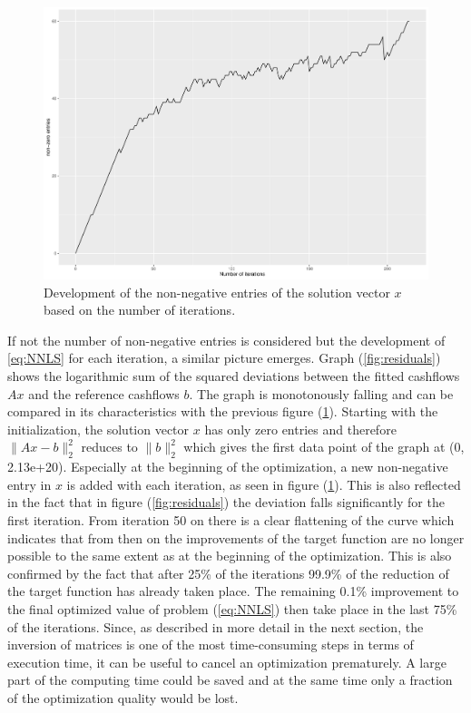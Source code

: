 \begin{figure}
	\centering
	\includegraphics[width=\textwidth]{figures/chapter_NNLS/number_iterations}
	\caption{Development of the non-negative entries of the solution vector $x$ based on the number of iterations.}
	\label{fig:iterations}
\end{figure}

If not the number of non-negative entries is considered but the development of \ref{eq:NNLS} for each iteration, a similar picture emerges. Graph (\ref{fig:residuals}) shows the logarithmic sum of the squared deviations between the fitted cashflows $Ax$ and the reference cashflows $b$. The graph is monotonously falling and can be compared in its characteristics with the previous figure (\ref{fig:iterations}). Starting with the initialization, the solution vector $x$ has only zero entries and therefore $\lVert Ax -b \rVert_2^2$ reduces to $\lVert b \rVert_2^2$ which gives the first data point of the graph at (0, 2.13e+20). Especially at the beginning of the optimization, a new non-negative entry in $x$ is added with each iteration, as seen in figure (\ref{fig:iterations}). This is also reflected in the fact that in figure (\ref{fig:residuals}) the deviation falls significantly for the first iteration. From iteration 50 on there is a clear flattening of the curve which indicates that from then on the improvements of the target function are no longer possible to the same extent as at the beginning of the optimization. This is also confirmed by the fact that after 25\% of the iterations 99.9\% of the reduction of the target function has already taken place. The remaining 0.1\% improvement to the final optimized value of problem (\ref{eq:NNLS}) then take place in the last 75\% of the iterations. Since, as described in more detail in the next section, the inversion of matrices is one of the most time-consuming steps in terms of execution time, it can be useful to cancel an optimization prematurely.  A large part of the computing time could be saved and at the same time only a fraction of the optimization quality would be lost. 


